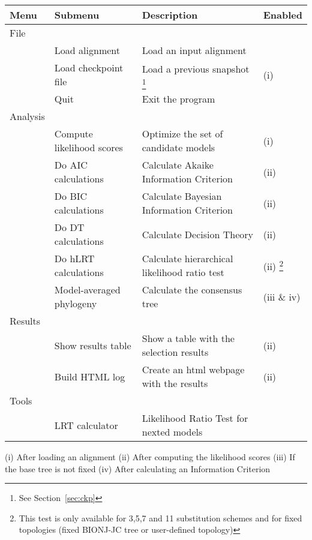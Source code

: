 \documentclass[10pt,twoside,a4paper]{article}
\begin{document}
\begin{minipage}{1\textwidth}
\small
\begin{tabular}{l l l l}
\hline
{\bf Menu} & {\bf Submenu} & {\bf Description} & {\bf Enabled} \\
\hline
File \\
& Load alignment & Load an input alignment & \\
& Load checkpoint file & Load a previous snapshot \footnote{See Section~\ref{sec:ckp}} & (i) \\
& Quit & Exit the program & \\
\hline
Analysis \\
& Compute likelihood scores & Optimize the set of candidate models & (i) \\
& Do AIC calculations & Calculate Akaike Information Criterion & (ii) \\
& Do BIC calculations & Calculate Bayesian Information Criterion & (ii) \\
& Do DT calculations & Calculate Decision Theory & (ii) \\
& Do hLRT calculations & Calculate hierarchical likelihood ratio test & (ii) \footnote{This test is only available for 3,5,7 and 11 substitution schemes and for fixed topologies (fixed BIONJ-JC tree or user-defined topology)} \\
& Model-averaged phylogeny & Calculate the consensus tree & (iii \& iv)  \\
\hline
Results \\
& Show results table & Show a table with the selection results & (ii) \\
& Build HTML log & Create an html webpage with the results & (ii) \\
\hline
Tools \\
& LRT calculator & Likelihood Ratio Test for nexted models & \\
\hline
\end{tabular}

\vspace{1em}
(i) After loading an alignment (ii) After computing the likelihood scores (iii) If the base tree is not fixed (iv) After calculating an Information Criterion
\end{minipage}





\end{document}
